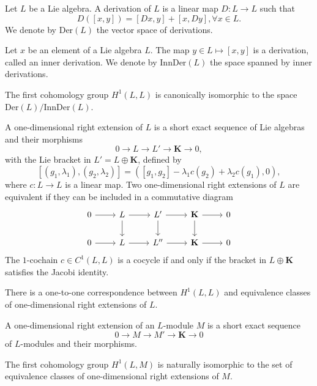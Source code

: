 \documentclass[11pt, twoside]{article}
\begin{document}
\begin{defi}
    Let $L$ be a Lie algebra. A derivation of $L$ is a linear map $D:L\to L$ such that $$D([x,y])=[Dx,y]+[x,Dy],  \forall x\in L.  $$ We denote by $\mathrm{Der}(L)$ the vector space of derivations.
\end{defi}

\begin{ex}
    Let $x$ be an element of a Lie algebra $L$. The map $y\in L\mapsto[x,y] $ is a derivation, called an inner derivation. We denote by $\mathrm{InnDer}(L)$ the space spanned by inner derivations.
\end{ex}

\begin{prop}
   The first cohomology group $H^1(L,L) $ is canonically isomorphic to the space $\mathrm{Der}(L)/\mathrm{InnDer}(L) $.
\end{prop}

A one-dimensional right extension of $L$ is a short exact sequence of Lie algebras and their morphisms $$0\to L\to L'\to \mathbf{K}\to 0, $$ with the Lie bracket in $L'=L\oplus \mathbf{K}$, defined by $$[(g_1,\lambda_1),(g_2,\lambda_2)]= ([g_1,g_2]-\lambda_1c(g_2)+\lambda_2c(g_1),0), $$ where $c:L\to L$ is a linear map. Two one-dimensional right extensions of $L$ are equivalent if they can be included in a commutative diagram \[\begin{tikzcd}
	0 & L & {L'} & {\mathbf{K}} & 0 \\
	0 & L & {L''} & {\mathbf{K}} & 0
	\arrow[from=1-1, to=1-2]
	\arrow[from=1-2, to=1-3]
	\arrow[from=1-2, to=2-2]
	\arrow[from=1-3, to=1-4]
	\arrow[from=1-3, to=2-3]
	\arrow[from=1-4, to=1-5]
	\arrow[from=1-4, to=2-4]
	\arrow[from=2-1, to=2-2]
	\arrow[from=2-2, to=2-3]
	\arrow[from=2-3, to=2-4]
	\arrow[from=2-4, to=2-5]
\end{tikzcd}\] The $1$-cochain $c\in C^1(L,L)$ is a cocycle if and only if the bracket in $L\oplus \mathbf{K}$ satisfies the Jacobi identity. 

\begin{prop}
    There is a one-to-one correspondence between $H^1(L,L)$ and equivalence classes of one-dimensional right extensions of $L$.
\end{prop}

A one-dimensional right extension of an $L$-module $M$ is a short exact sequence $$0\to M\to M'\to \mathbf{K}\to 0 $$ of $L$-modules and their morphisms. 

 \begin{prop}
     The first cohomology group $H^1(L,M)$ is naturally isomorphic to the set of equivalence classes of one-dimensional right extensions of $M$.
 \end{prop} 
\end{document}
